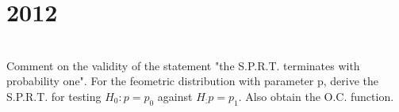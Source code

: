 \section*{2012}
\vspace{-.5cm}
\hrulefill \smallskip\\
 Comment on the validity of the statement "the S.P.R.T. terminates with probability one". For the feometric distribution with parameter p, derive the S.P.R.T. for testing $H_0 : p = p_0$ against $H_ : p = p_1$. Also obtain the O.C. function.